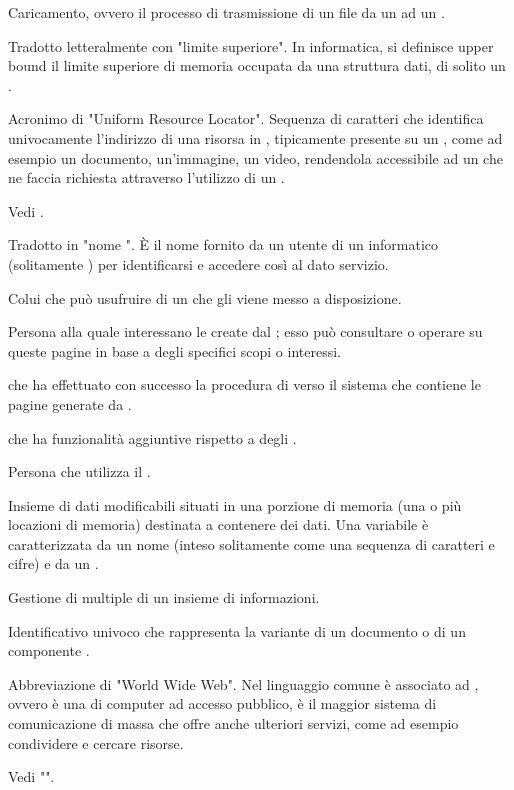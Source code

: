 

{Caricamento, ovvero il processo di trasmissione di un file da un  ad un .}

{Tradotto letteralmente con "limite superiore". In informatica, si definisce upper bound il limite superiore di memoria occupata da una struttura dati, di solito un .}

{Acronimo di "Uniform Resource Locator". Sequenza di caratteri che identifica univocamente l'indirizzo di una risorsa in , tipicamente presente su un  , come ad esempio un documento, un'immagine, un video, rendendola accessibile ad un  che ne faccia richiesta attraverso l'utilizzo di un  .}

{Vedi .}

{Tradotto in "nome ". \`{E} il nome fornito da un utente di un  informatico (solitamente ) per identificarsi e accedere così al dato servizio.}

{Colui che può usufruire di un  che gli viene messo a disposizione.}

{Persona alla quale interessano le  create dal  ; esso può consultare o operare su queste pagine in base a degli specifici scopi o interessi.}

{ che ha effettuato con successo la procedura di  verso il sistema che contiene le pagine generate da .}

{ che ha funzionalità aggiuntive rispetto a degli .}

{Persona che utilizza il  .}




{Insieme di dati modificabili situati in una porzione di memoria (una o più locazioni di memoria) destinata a contenere dei dati. Una variabile è caratterizzata da un nome (inteso solitamente come una sequenza di caratteri e cifre) e da un .}

{Gestione di  multiple di un insieme di informazioni.}

{Identificativo univoco che rappresenta la variante di un documento o di un componente .}




{Abbreviazione di "World Wide Web". Nel linguaggio comune è associato ad , ovvero è una  di computer ad accesso pubblico, è il maggior sistema di comunicazione di massa che offre anche ulteriori servizi, come ad esempio condividere e cercare risorse.}

{Vedi "".}
